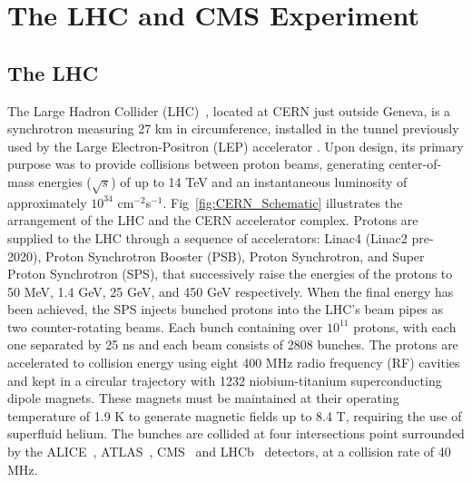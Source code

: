 \chapter{The LHC and CMS Experiment}
\label{sec:cms}

\section{The LHC}

The Large Hadron Collider (LHC)~\cite{Evans:2008zzb}, located at CERN just outside Geneva, is a synchrotron measuring 27 km in circumference, installed in the tunnel previously used by the Large Electron-Positron (LEP) accelerator \cite{203828}. 
Upon design, its primary purpose was to provide collisions between proton beams, generating center-of-mass energies ($\sqrt{s}$) of up to 14 TeV and an instantaneous luminosity of approximately $10^{34}$ cm$^{−2}$s$^{−1}$. 
Fig~\ref{fig:CERN_Schematic} illustrates the arrangement of the LHC and the CERN accelerator complex. 
Protons are supplied to the LHC through a sequence of accelerators: Linac4 (Linac2 pre-2020), Proton Synchrotron Booster (PSB), Proton Synchrotron, and Super Proton Synchrotron (SPS), that successively raise the energies of the protons to 50 MeV, 1.4 GeV, 25 GeV, and 450 GeV respectively. 
When the final energy has been achieved, the SPS injects bunched protons into the LHC's beam pipes as two counter-rotating beams. 
Each bunch containing over $10^11$ protons, with each one separated by 25 ns and each beam consists of 2808 bunches. 
The protons are accelerated to collision energy using eight 400 MHz radio frequency (RF) cavities and kept in a circular trajectory with 1232 niobium-titanium superconducting dipole magnets. 
These magnets must be maintained at their operating temperature of 1.9 K to generate magnetic fields up to 8.4 T, requiring the use of superfluid helium. 
The bunches are collided at four intersections point surrounded by the ALICE~\cite{ALICE:2008ngc}, ATLAS~\cite{ATLAS:2008xda}, CMS~\cite{CMS_Setup} and LHCb~\cite{LHCb:2008vvz} detectors, at a collision rate of 40 MHz. \\

